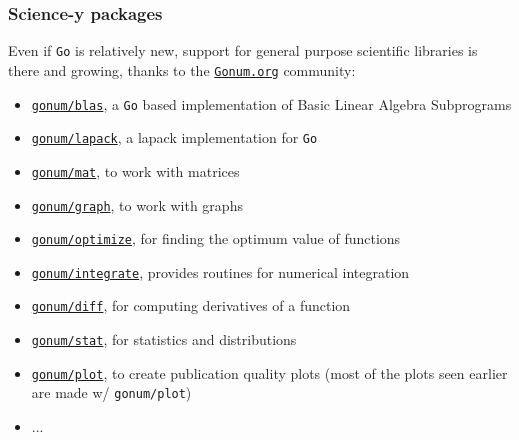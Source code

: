\documentclass[9pt]{beamer}
\newcommand{\myblue} [1] {{\color{blue}#1}}
\begin{document}
\begin{frame}[fragile]
\frametitle{Science-y packages}


Even if \texttt{Go} is relatively new, support for general purpose scientific libraries is there and growing, thanks to the \myblue{\href{https://gonum.org}{\texttt{Gonum.org}}} community:


\begin{itemize}
\item \myblue{\href{https://godoc.org/gonum.org/v1/gonum/blas}{\texttt{gonum/blas}}}, a \texttt{Go} based implementation of Basic Linear Algebra Subprograms
\item \myblue{\href{https://godoc.org/gonum.org/v1/gonum/lapack}{\texttt{gonum/lapack}}}, a lapack implementation for \texttt{Go}
\item \myblue{\href{https://godoc.org/gonum.org/v1/gonum/mat}{\texttt{gonum/mat}}}, to work with matrices
\item \myblue{\href{https://godoc.org/gonum.org/v1/gonum/graph}{\texttt{gonum/graph}}}, to work with graphs
\item \myblue{\href{https://godoc.org/gonum.org/v1/gonum/optimize}{\texttt{gonum/optimize}}}, for finding the optimum value of functions
\item \myblue{\href{https://godoc.org/gonum.org/v1/gonum/integrate}{\texttt{gonum/integrate}}}, provides routines for numerical integration
\item \myblue{\href{https://godoc.org/gonum.org/v1/gonum/diff}{\texttt{gonum/diff}}}, for computing derivatives of a function
\item \myblue{\href{https://godoc.org/gonum.org/v1/gonum/stat}{\texttt{gonum/stat}}}, for statistics and distributions
\item \myblue{\href{http://godoc.org/gonum.org/v1/plot}{\texttt{gonum/plot}}}, to create publication quality plots (most of the plots seen earlier are made w/ \texttt{gonum/plot})
\item ...
\end{itemize}


\end{frame}
\end{document}
